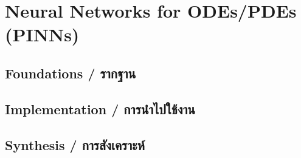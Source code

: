 \chapter{Neural Networks for ODEs/PDEs (PINNs)}
\label{ch:pinns}

\section{Foundations \quad / \quad \textthai{รากฐาน}}



\section{Implementation \quad / \quad \textthai{การนำไปใช้งาน}}



\section{Synthesis \quad / \quad \textthai{การสังเคราะห์}}



